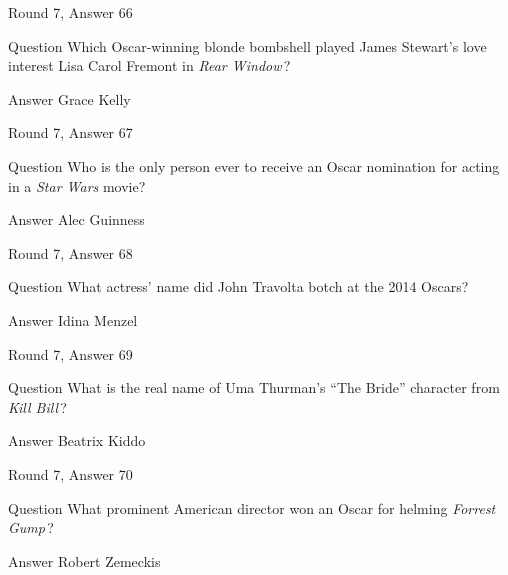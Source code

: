 \documentclass[11pt]{beamer}
\begin{document}
\begin{frame}[t]{Round 7, Answer 66}
\vspace{2em}
\begin{block}{Question}
Which Oscar-winning blonde bombshell played James Stewart's love interest Lisa Carol Fremont in \emph{Rear Window}\,?
\end{block}
\pause{}
\begin{block}{Answer}
Grace Kelly
\end{block}
\end{frame}
    

\begin{frame}[t]{Round 7, Answer 67}
\vspace{2em}
\begin{block}{Question}
Who is the only person ever to receive an Oscar nomination for acting in a \emph{Star Wars} movie?
\end{block}
\pause{}
\begin{block}{Answer}
Alec Guinness
\end{block}
\end{frame}
    

\begin{frame}[t]{Round 7, Answer 68}
\vspace{2em}
\begin{block}{Question}
What actress' name did John Travolta botch at the 2014 Oscars?
\end{block}
\pause{}
\begin{block}{Answer}
Idina Menzel
\end{block}
\end{frame}
    

\begin{frame}[t]{Round 7, Answer 69}
\vspace{2em}
\begin{block}{Question}
What is the real name of Uma Thurman's ``The Bride'' character from \emph{Kill Bill}\,?
\end{block}
\pause{}
\begin{block}{Answer}
Beatrix Kiddo
\end{block}
\end{frame}
    

\begin{frame}[t]{Round 7, Answer 70}
\vspace{2em}
\begin{block}{Question}
What prominent American director won an Oscar for helming \emph{Forrest Gump}\,?
\end{block}
\pause{}
\begin{block}{Answer}
Robert Zemeckis
\end{block}
\end{frame}
    
\end{document}
